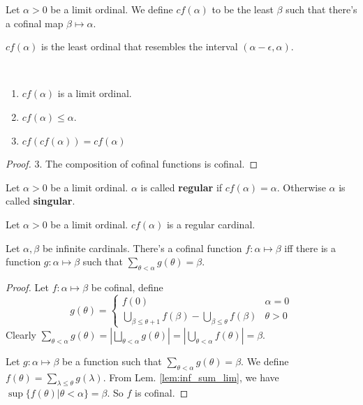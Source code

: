 \documentclass[12pt]{book}
\begin{document}
\begin{definition}
	Let $\alpha>0$ be a limit ordinal. We define $cf(\alpha)$ to be the least $\beta$ such that there's a cofinal map $\beta\mapsto\alpha$.
\end{definition}

$cf(\alpha)$ is the least ordinal that resembles the interval $(\alpha-\epsilon,\alpha)$.

\begin{lemma}
	\
	\begin{enumerate}
		\item $cf(\alpha)$ is a limit ordinal.
		\item $cf(\alpha)\leq \alpha$.
		\item $cf(cf(\alpha))=cf(\alpha)$
	\end{enumerate}
\end{lemma}
\begin{proof}
	3. The composition of cofinal functions is cofinal.
\end{proof}

\begin{definition}
	Let $\alpha>0$ be a limit ordinal. $\alpha$ is called {\bf regular} if $cf(\alpha)=\alpha$. Otherwise $\alpha$ is called {\bf singular}.
\end{definition}

\begin{lemma}
	Let $\alpha>0$ be a limit ordinal. $cf(\alpha)$ is a regular cardinal.
\end{lemma}

\begin{lemma}
	Let $\alpha,\beta$ be infinite cardinals. There's a cofinal function $f:\alpha\mapsto\beta$ iff there is a function $g:\alpha\mapsto\beta$ such that $\sum_{\theta<\alpha} g(\theta)=\beta$.
\end{lemma}
\begin{proof}
	Let $f:\alpha\mapsto\beta$ be cofinal, define
	\begin{equation}
		g(\theta)=\left\{\begin{array}{cc}
			f(0)&\alpha=0\\
			\bigcup_{\beta\leq\theta+1} f(\beta)-\bigcup_{\beta\leq\theta} f(\beta) &\theta>0
		\end{array} \right.
	\end{equation}
	Clearly $\sum_{\theta<\alpha} g(\theta)=|\bigsqcup_{\theta<\alpha} g(\theta)|=|\bigcup_{\theta<\alpha} f(\theta)|=\beta$.
	
	Let $g:\alpha\mapsto\beta$ be a function such that $\sum_{\theta<\alpha} g(\theta)=\beta$. We define $f(\theta)=\sum_{\lambda\leq\theta}g(\lambda)$. From Lem. \ref{lem:inf_sum_lim}, we have $\sup\{f(\theta)|\theta<\alpha\}=\beta$. So $f$ is cofinal.
\end{proof}
\end{document}
